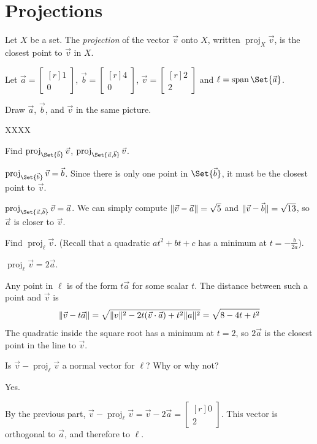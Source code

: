 \documentclass{problemset}
\DeclareMathOperator{\Span}{span}
\DeclareMathOperator{\Proj}{proj}
\newcommand{\mat}[1]{\begin{bmatrix*}[r]#1\end{bmatrix*}}
\DeclarePairedDelimiter\norm{\lVert}{\rVert}
\begin{document}
\section*{Projections}
	
	\begin{definition}[Projection]
		Let $X$ be a set. The \emph{projection} of the vector $\vec v$
		onto $X$, written $\Proj_X\vec v$, is the closest point to $\vec v$ in $X$.
	\end{definition}

	\question
	Let $\vec a=\mat{1\\0}$, $\vec b=\mat{4\\0}$, $\vec v=\mat{2\\2}$ and
	$\ell=\Span\Set{\vec a}$.
	\begin{parts}
		\item Draw $\vec a$, $\vec b$, and $\vec v$ in the same picture.
			\begin{solution}
				XXXX
			\end{solution}
		\item Find $\Proj_{\Set{\vec b}}\vec v$, $\Proj_{\Set{\vec a,\vec b}}\vec v$.
			\begin{solution}
				$\Proj_{\Set{\vec b}}\vec v = \vec b$. Since there is only one
				point in $\Set{\vec b}$, it must be the closest point to $\vec v$. 

				$\Proj_{\Set{\vec a,\vec b}}\vec v=\vec a$. We can simply compute
				$\norm{\vec v-\vec a} = \sqrt{5}$ and $\norm{\vec v-\vec b} = \sqrt{13}$,
				so $\vec a$ is closer to $\vec v$. 
			\end{solution}
		\item Find $\Proj_\ell \vec v$. (Recall that a quadratic $at^2+bt+c$ has 
			a minimum at $t=-\tfrac{b}{2a}$).
			\begin{solution}
				$\Proj_\ell \vec v = 2\vec a$.

				Any point in $\ell$ is of the form $t\vec a$ for some scalar 
				$t$. The distance between such a point and $\vec v$ is
				\[
					\norm{\vec v - t\vec a}
					=\sqrt{\norm{v}^2 - 2t(\vec v\cdot \vec a) + t^2 \norm{a}^2}
					=\sqrt{8 - 4t + t^2}
				\]
				The quadratic inside the square root has a minimum at 
				$t = 2$, so $2 \vec a$ is the closest point in the line
				to $\vec v$. 
			\end{solution}
		\item Is $\vec v-\Proj_\ell \vec v$ a normal vector for $\ell$?
			Why or why not?
			\begin{solution}
				Yes. 

				By the previous part, $\vec v-\Proj_\ell \vec v=\vec v-2\vec a=\mat{0\\2}$.
				This vector is orthogonal to $\vec a$, and therefore to $\ell$. 
			\end{solution}
	\end{parts}
\end{document}
